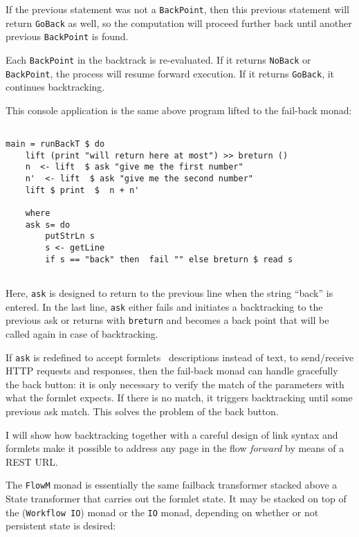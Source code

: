 \documentclass{tmr}
\begin{document}
If the previous statement was not a {\tt BackPoint}, then this  previous statement will return {\tt GoBack} as well, so the computation will proceed further back until another previous {\tt BackPoint} is found. 
 
Each {\tt BackPoint} in the backtrack is re-evaluated. If it returns {\tt NoBack} or {\tt BackPoint}, the process will resume forward execution. If it returns {\tt GoBack}, it continues backtracking. 
 
This console application is the same above program lifted to the fail-back monad: 
 
{\tt 
 
\begin{verbatim} 
 
main = runBackT $ do 
    lift (print "will return here at most") >> breturn () 
    n  <- lift  $ ask "give me the first number" 
    n'  <- lift  $ ask "give me the second number" 
    lift $ print  $  n + n' 
 
    where 
    ask s= do 
        putStrLn s 
        s <- getLine 
        if s == "back" then  fail "" else breturn $ read s 
 
\end{verbatim} 
 
} 
 
Here, {\tt ask} is designed to return to the  previous line  when the string ``back'' is entered. In the last line, {\tt ask} either fails and initiates a backtracking to the previous ask or returns with {\tt breturn} and becomes a back point that will be called again in case of backtracking. 
 
If {\tt ask} is redefined to accept formlets~\cite{auth:formlets} descriptions instead of text, to send/receive HTTP requests and 
responses, then the fail-back monad can handle gracefully the  back button: it is only necessary to verify the match of the parameters with what the formlet expects. If there is no match, it triggers backtracking until some previous ask match. This solves the problem of the back button. 
 
I will show how backtracking together with a careful design of link syntax and formlets make it possible to address any page in the flow \textit{forward} by means of a REST URL\@. 
 
The {\tt FlowM} monad is essentially the same failback transformer stacked above a State transformer that carries out the formlet state. It may be stacked on top of the ({\tt Workflow IO}) monad or the {\tt IO} monad, depending on whether or not persistent state is desired: 
 
\end{document}
